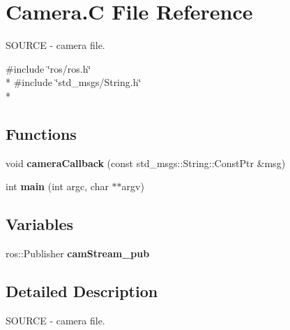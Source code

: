 \hypertarget{Camera_8C}{\section{Camera.\-C File Reference}
\label{Camera_8C}
}


S\-O\-U\-R\-C\-E -\/ camera file.  


{\ttfamily \#include \char`\"{}ros/ros.\-h\char`\"{}}\\*
{\ttfamily \#include \char`\"{}std\-\_\-msgs/\-String.\-h\char`\"{}}\\*
\subsection*{Functions}
\begin{DoxyCompactItemize}
\item 
\hypertarget{Camera_8C_a14253152440fb4c98ddeeb03c766a3c0}{void {\bfseries camera\-Callback} (const std\-\_\-msgs\-::\-String\-::\-Const\-Ptr \&msg)}\label{Camera_8C_a14253152440fb4c98ddeeb03c766a3c0}

\item 
\hypertarget{Camera_8C_a3c04138a5bfe5d72780bb7e82a18e627}{int {\bfseries main} (int argc, char $\ast$$\ast$argv)}\label{Camera_8C_a3c04138a5bfe5d72780bb7e82a18e627}

\end{DoxyCompactItemize}
\subsection*{Variables}
\begin{DoxyCompactItemize}
\item 
\hypertarget{Camera_8C_aec4c7a9801a00f27f39f6bd77aec69ca}{ros\-::\-Publisher {\bfseries cam\-Stream\-\_\-pub}}\label{Camera_8C_aec4c7a9801a00f27f39f6bd77aec69ca}

\end{DoxyCompactItemize}


\subsection{Detailed Description}
S\-O\-U\-R\-C\-E -\/ camera file. 